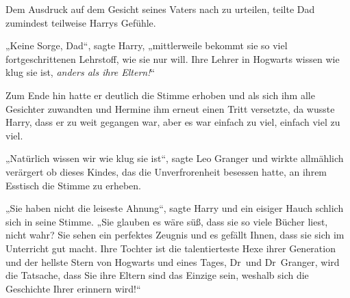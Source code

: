 Dem Ausdruck auf dem Gesicht seines Vaters nach zu urteilen, teilte Dad zumindest teilweise Harrys Gefühle.

„Keine Sorge, Dad“, sagte Harry, „mittlerweile bekommt sie so viel fortgeschrittenen Lehrstoff, wie sie nur will. Ihre Lehrer in Hogwarts wissen wie klug sie ist, \emph{anders als ihre Eltern!}“

Zum Ende hin hatte er deutlich die Stimme erhoben und als sich ihm alle Gesichter zuwandten und Hermine ihm erneut einen Tritt versetzte, da wusste Harry, dass er zu weit gegangen war, aber es war einfach zu viel, einfach viel zu viel.

„Natürlich wissen wir wie klug sie ist“, sagte Leo Granger und wirkte allmählich verärgert ob dieses Kindes, das die Unverfrorenheit besessen hatte, an ihrem Esstisch die Stimme zu erheben.

„Sie haben nicht die leiseste Ahnung“, sagte Harry und ein eisiger Hauch schlich sich in seine Stimme. „Sie glauben es wäre süß, dass sie so viele Bücher liest, nicht wahr? Sie sehen ein perfektes Zeugnis und es gefällt Ihnen, dass sie sich im Unterricht gut macht. Ihre Tochter ist die talentierteste Hexe ihrer Generation und der hellste Stern von Hogwarts und eines Tages, Dr~und Dr~Granger, wird die Tatsache, dass Sie ihre Eltern sind das Einzige sein, weshalb sich die Geschichte Ihrer erinnern wird!“

